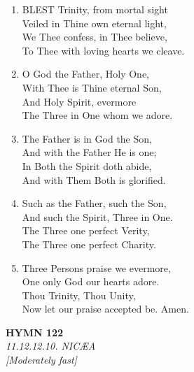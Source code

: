 \documentclass[11pt,a4paper]{article}
\begin{document}
\begin{enumerate}
    \item BLEST Trinity, from mortal sight \\
        Veiled in Thine own eternal light, \\
        We Thee confess, in Thee believe, \\
        To Thee with loving hearts we cleave.

    \item O God the Father, Holy One, \\
        With Thee is Thine eternal Son, \\
        And Holy Spirit, evermore \\
        The Three in One whom we adore.

    \item The Father is in God the Son, \\
        And with the Father He is one; \\
        In Both the Spirit doth abide, \\
        And with Them Both is glorified.

    \item Such as the Father, such the Son, \\
        And such the Spirit, Three in One. \\
        The Three one perfect Verity, \\
        The Three one perfect Charity.

    \item Three Persons praise we evermore, \\
        One only God our hearts adore. \\
        Thou Trinity, Thou Unity, \\
        Now let our praise accepted be. Amen.

\end{enumerate}

\newpage
\begin{center}
    {\Large \textbf{HYMN 122\textdagger{}}}
    \\
    \textit{11.12.12.10. NIC{\AE}A}
    \\
    \textit{\small [Moderately fast]}
\end{center}
\vspace{1em}
\end{document}
